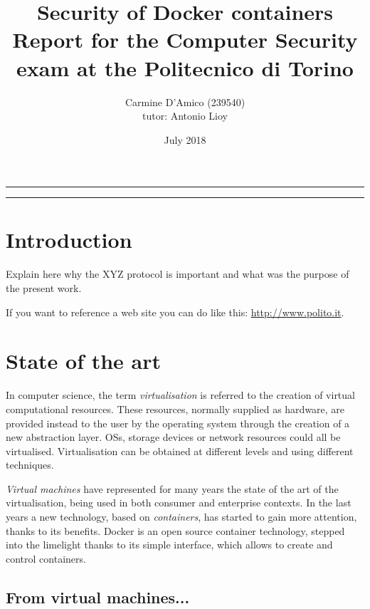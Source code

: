 \documentclass[a4paper,12pt]{article}
\begin{document}
\title{Security of Docker containers
\\
{\normalsize Report for the Computer Security exam at the Politecnico di Torino}
}
\author{Carmine D'Amico (239540)
\\
{\normalsize tutor: Antonio Lioy}
}
\date{July 2018}
\maketitle

\vfill

\rule{\textwidth}{1pt}

\tableofcontents

\rule{\textwidth}{1pt}

\vfill

\newpage

\section{Introduction}

Explain here why the XYZ protocol is important
and what was the purpose of the present work.

If you want to reference a web site you can do like this:
\url{http://www.polito.it}.

\newpage

\section{State of the art}

In computer science, the term \textit{virtualisation} is referred to the 
creation of virtual computational resources. These resources, normally supplied 
as hardware, are provided instead to the user by the operating system through the 
creation of a new abstraction layer. OSs, storage devices or network resources 
could all be virtualised. Virtualisation can be obtained at different levels and 
using different techniques.
\par\textit{Virtual machines} have represented for many years the state of the art
of the virtualisation, being used in both consumer and enterprise contexts. In 
the last years a new technology, based on \textit{containers}, has started to 
gain more attention, thanks to its benefits. Docker is an open source container 
technology, stepped into the limelight thanks to its simple interface, which allows
to create and control containers. 

\subsection{From virtual machines...}
\end{document}
